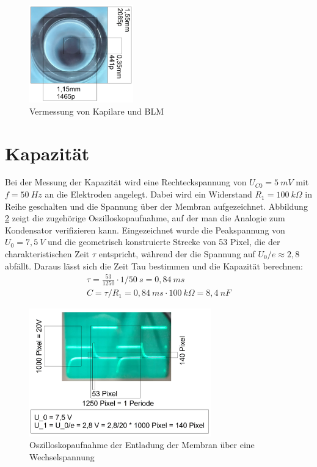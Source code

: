 \documentclass{include/thesisclass3}
\begin{document}
\begin{figure}[ht]
	\begin{center}
		\includegraphics[width=0.4\textwidth]{images/Perle2.png}
		\caption{Vermessung von Kapilare und BLM}
		\label{Perle}
	\end{center}
\end{figure}

\section{Kapazität}
Bei der Messung der Kapazität wird eine Rechteckspannung von $U_{C0}=5~\si{mV}$ mit $f=50~\si{Hz}$ an die Elektroden angelegt. Dabei wird ein Widerstand $R_1=100~\si{k\Omega}$ in Reihe geschalten und die Spannung über der Membran aufgezeichnet. Abbildung \ref{oszi} zeigt die zugehörige Oszilloskopaufnahme, auf der man die Analogie zum Kondensator verifizieren kann. Eingezeichnet wurde die Peakspannung von $U_0 = 7,5~\si{V}$ und die geometrisch konstruierte Strecke von 53 Pixel, die der charakteristischen Zeit $\tau$ entspricht, während der die Spannung auf $U_0/\textit{e}\approx 2,8$ abfällt. Daraus lässt sich die Zeit Tau bestimmen und die Kapazität berechnen:
\begin{align*}
\tau = \frac{53}{1250} \cdot 1/50 ~\si{s}= 0,84 ~\si{ms}\\
C=\tau / R_1 = 0,84~\si{ms} \cdot 100~\si{k\Omega} = 8,4 ~\si{nF}
\end{align*}
\begin{figure}[ht]
	\begin{center}
		\includegraphics[width=0.7\textwidth]{images/measure.png}
		\caption{Oszilloskopaufnahme der Entladung der Membran über eine Wechselspannung}
		\label{oszi}
	\end{center}
\end{figure}
\end{document}
